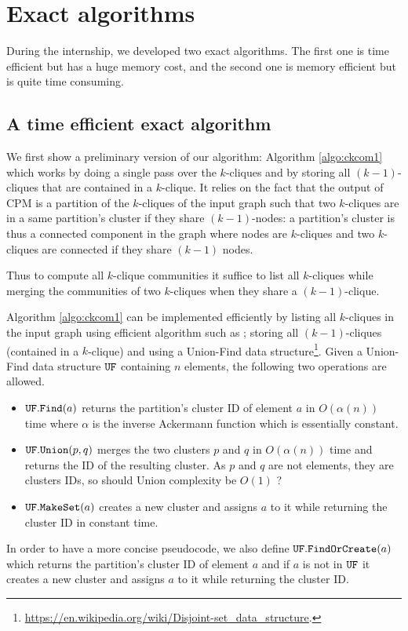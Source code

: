 \section{Exact algorithms}

During the internship, we developed two exact algorithms. The first one is time efficient but has a huge memory cost, and the second one is memory efficient but is quite time consuming.

\subsection{A time efficient exact algorithm}

We first show a preliminary version of our algorithm: Algorithm \ref{algo:ckcom1} which works by doing a single pass over the $k$-cliques and by storing all $(k-1)$-cliques that are contained in a $k$-clique. It relies on the fact that the output of CPM is a partition of the $k$-cliques of the input graph such that two 
$k$-cliques are in a same partition's cluster if they share $(k-1)$-nodes: a partition's cluster is thus a connected component in the graph where nodes are $k$-cliques and two $k$-cliques are connected if they share $(k-1)$ nodes.

Thus to compute all $k$-clique communities it suffice to list all $k$-cliques while merging the communities of two $k$-cliques when they 
share a $(k-1)$-clique.

\vspace{0.3cm}

 Algorithm \ref{algo:ckcom1} can be implemented efficiently by listing all $k$-cliques in the input graph using efficient algorithm such as \cite{chiba1985arboricity}; storing all $(k-1)$-cliques (contained in a $k$-clique) and using a Union-Find data structure\footnote{\url{https://en.wikipedia.org/wiki/Disjoint-set_data_structure}.}. Given a Union-Find data structure $\tt UF$ containing $n$ elements, the following two operations are allowed.
\begin{itemize}
\item ${\tt UF.Find}(a)$ returns the partition's cluster ID of element $a$ in $O(\alpha(n))$ time where $\alpha$ is the inverse Ackermann function which is essentially constant.
\item ${\tt UF.Union}(p,q)$ merges the two clusters $p$ and $q$ in $O(\alpha(n))$ time and returns the ID of the resulting cluster.
{\color{red} As $p$ and $q$ are not
elements, they are clusters IDs, so
should Union complexity be $O(1)$ ? }

\item ${\tt UF.MakeSet}(a)$ creates a new cluster and assigns $a$ to it while returning the cluster ID in constant time.
\end{itemize}
In order to have a more concise pseudocode, we also define ${\tt UF.FindOrCreate}(a)$ which returns the partition's cluster ID of element $a$ and if $a$ is not in $\tt{UF}$ it creates a new cluster and assigns $a$ to it while returning the cluster ID.

